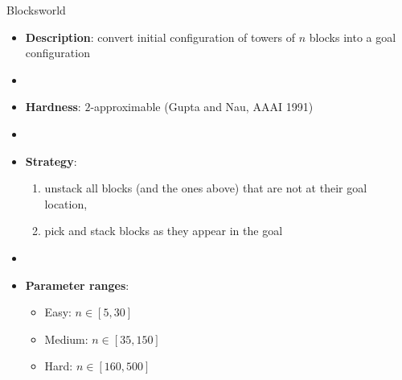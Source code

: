 \documentclass[aspectratio=169,xcolor=dvipsnames]{beamer}
\begin{document}
\begin{frame}{Blocksworld}

    \begin{itemize}
        \item \textbf{Description}: convert initial configuration of towers of $n$ blocks into a goal configuration
        \item[]
        \item \textbf{Hardness}: $2$-approximable (Gupta and Nau, AAAI 1991)
        \item[]
        \item \textbf{Strategy}:
        \begin{enumerate}
            \item unstack all blocks (and the ones above) that are not at their goal location,
            \item pick and stack blocks as they appear in the goal
        \end{enumerate}
        \item[]
        \item \textbf{Parameter ranges}:
        \begin{itemize}
            \item Easy: $n \in [5, 30]$
            \item Medium: $n \in [35, 150]$
            \item Hard: $n \in [160, 500]$
        \end{itemize}
    \end{itemize}

\end{frame}
\end{document}
